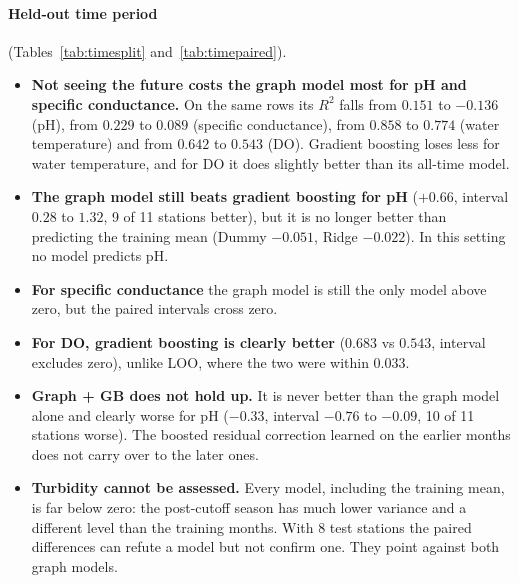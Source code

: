 \documentclass[11pt]{article}
\begin{document}
\paragraph{Held-out time period} (Tables~\ref{tab:timesplit} and~\ref{tab:timepaired}).
\begin{itemize}
  \item \textbf{Not seeing the future costs the graph model most for pH and specific
        conductance.} On the same rows its $R^2$ falls from $0.151$ to $-0.136$ (pH), from $0.229$
        to $0.089$ (specific conductance), from $0.858$ to $0.774$ (water temperature) and from
        $0.642$ to $0.543$ (DO). Gradient boosting loses less for water temperature, and for DO it
        does slightly better than its all-time model.
  \item \textbf{The graph model still beats gradient boosting for pH} ($+0.66$, interval
        $0.28$ to $1.32$, 9 of 11 stations better), but it is no longer better than predicting the
        training mean (Dummy $-0.051$, Ridge $-0.022$). In this setting no model predicts pH.
  \item \textbf{For specific conductance} the graph model is still the only model above zero, but
        the paired intervals cross zero.
  \item \textbf{For DO, gradient boosting is clearly better} ($0.683$ vs $0.543$, interval excludes
        zero), unlike LOO, where the two were within $0.033$.
  \item \textbf{Graph + GB does not hold up.} It is never better than the graph model alone and
        clearly worse for pH ($-0.33$, interval $-0.76$ to $-0.09$, 10 of 11 stations worse). The
        boosted residual correction learned on the earlier months does not carry over to the later
        ones.
  \item \textbf{Turbidity cannot be assessed.} Every model, including the training mean, is far
        below zero: the post-cutoff season has much lower variance and a different level than the
        training months. With 8 test stations the paired differences can refute a model but not
        confirm one. They point against both graph models.
\end{itemize}
\end{document}
